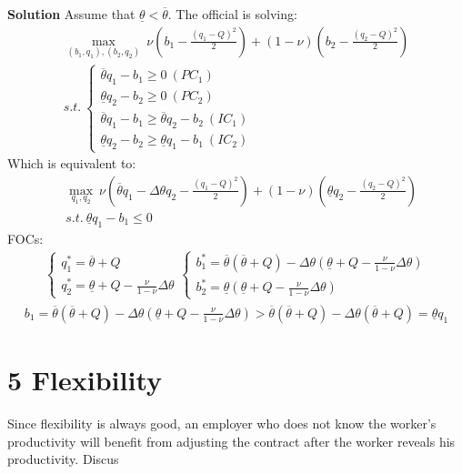 \documentclass[a4paper]{article}
\newcommand{\ubar}{\overline}
\newcommand{\lbar}{\underline}
\begin{document}
	
	\textbf{Solution}
	Assume that $\lbar{\theta} < \ubar{\theta}$. The official is solving:
	\begin{align*}
	\underset{(b_1, q_1), (b_2, q_2)}{\max}\ \nu\left(b_1 - \frac{(q_1 - Q)^2}{2}\right) + (1 - \nu) \left(b_2 - \frac{(q_2 - Q)^2}{2}\right)\\
	s.t.\ \begin{cases}
	\ubar{\theta}q_1 - b_1 \ge 0\ (PC_1)\\
	\lbar{\theta}q_2 - b_2 \ge 0\ (PC_2)\\
	\ubar{\theta}q_1 - b_1 \ge \ubar{\theta}q_2 - b_2\ (IC_1)\\
	\lbar{\theta} q_2 - b_2 \ge \lbar{\theta}q_1 - b_1\ (IC_2)
	\end{cases}
	\end{align*}
	Which is equivalent to:
	\begin{align*}
	&\underset{q_1, q_2}{\max}\ \nu \left(\ubar{\theta}q_1 - \Delta \theta q_2 - \frac{(q_1 - Q)^2}{2}\right) + (1 - \nu) \left(\lbar{\theta}q_2 -\frac{(q_2 - Q)^2}{2}\right) \\
	&s.t.\ \lbar{\theta}q_1 - b_1 \le 0
	\end{align*}
	FOCs:
	\begin{align*}
	\begin{cases}
	q_1^* = \ubar{\theta} + Q\\
	q_2^* = \lbar{\theta} + Q - \frac{\nu}{1 - \nu} \Delta \theta	
	\end{cases} \begin{cases}
	b_1^* = \ubar{\theta}(\ubar{\theta} + Q) - \Delta \theta (\lbar{\theta} +Q - \frac{\nu}{1 - \nu} \Delta \theta)\\
	b_2^* = \lbar{\theta}(\lbar{\theta} +Q - \frac{\nu}{1 - \nu} \Delta \theta)
	\end{cases}
	\end{align*}
	\begin{align*}
	b_1 = \ubar{\theta}(\ubar{\theta} + Q) - \Delta \theta (\lbar{\theta} +Q - \frac{\nu}{1 - \nu} \Delta \theta) > \ubar{\theta}(\ubar{\theta} + Q) - \Delta \theta (\ubar{\theta} + Q) = \lbar{\theta} q_1
	\end{align*}
	
	\section*{5 Flexibility}
		Since flexibility is always good, an employer who does not know the worker's productivity
		will benefit from adjusting the contract after the worker reveals his productivity. Discus
		
\end{document}
